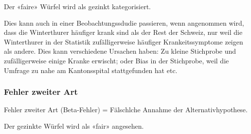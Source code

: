 Der «faire» Würfel wird als gezinkt kategorisiert.

Dies kann auch in einer Beobachtungssdudie passieren, wenn \zB
angenommen wird, dass die Winterthurer häufiger krank sind als der
Rest der Schweiz, nur weil die Winterthurer in der Statistik
zufälligerweise häufiger Krankeitssymptome zeigen als andere. Dies
kann verschiedene Ursachen haben: Zu kleine Stichprobe und
zufälligerweise einige Kranke erwischt; oder Bias in der Stichprobe,
weil die Umfrage zu nahe am Kantonsspital stattgefunden hat etc.

\subsubsection{Fehler zweiter Art}
Fehler zweiter Art (Beta-Fehler) = Fälschlche Annahme der Alternativhypothese.

Der gezinkte Würfel wird als «fair» angesehen.


\platzFuerBerechnungenBisEndeSeite{}
\newpage




